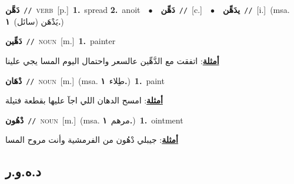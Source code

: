 \documentclass[10pt,a4paper,twoside]{article} %
\begin{document}
\begin{multicols}{2}
{\setlength\topsep{0pt}\textbf{\foreignlanguage{arabic}{دَهَّن}}\ {\color{gray}\texttt{//}\color{black}}\ \textsc{verb}\ [p.]\ \textbf{1.}~spread  \textbf{2.}~anoit\ \ $\bullet$\ \ \setlength\topsep{0pt}\textbf{\foreignlanguage{arabic}{دَهِّن}}\ {\color{gray}\texttt{//}\color{black}}\ [c.]\ \ $\bullet$\ \ \setlength\topsep{0pt}\textbf{\foreignlanguage{arabic}{يدَهِّن}}\ {\color{gray}\texttt{//}\color{black}}\ [i.]\ \color{gray}(msa. \foreignlanguage{arabic}{يَدْهَن (سائل)}~\foreignlanguage{arabic}{\textbf{١.}})\color{black}\ } \vspace{2mm}

{\setlength\topsep{0pt}\textbf{\foreignlanguage{arabic}{دَهِّين}}\ {\color{gray}\texttt{//}\color{black}}\ \textsc{noun}\ [m.]\ \textbf{1.}~painter\  \begin{flushright}\color{gray}\foreignlanguage{arabic}{\textbf{\underline{\foreignlanguage{arabic}{أمثلة}}}: اتفقت مع الدَّهِّين عالسعر واحتمال اليوم المسا يجي علينا}\end{flushright}\color{black}} \vspace{2mm}

{\setlength\topsep{0pt}\textbf{\foreignlanguage{arabic}{دْهَان}}\ {\color{gray}\texttt{//}\color{black}}\ \textsc{noun}\ [m.]\ \color{gray}(msa. \foreignlanguage{arabic}{طِلاء}~\foreignlanguage{arabic}{\textbf{١.}})\color{black}\ \textbf{1.}~paint\  \begin{flushright}\color{gray}\foreignlanguage{arabic}{\textbf{\underline{\foreignlanguage{arabic}{أمثلة}}}: امسح الدهان اللي اجآ عليها بقطعة فتيلة}\end{flushright}\color{black}} \vspace{2mm}

{\setlength\topsep{0pt}\textbf{\foreignlanguage{arabic}{دْهُون}}\ {\color{gray}\texttt{//}\color{black}}\ \textsc{noun}\ [m.]\ \color{gray}(msa. \foreignlanguage{arabic}{مرهم}~\foreignlanguage{arabic}{\textbf{١.}})\color{black}\ \textbf{1.}~ointment\  \begin{flushright}\color{gray}\foreignlanguage{arabic}{\textbf{\underline{\foreignlanguage{arabic}{أمثلة}}}: جيبلي دْهُون من الفرمشية وأنت مروح المسا}\end{flushright}\color{black}} \vspace{2mm}

\vspace{-3mm}
\subsection*{\color{blue}\foreignlanguage{arabic}{د.ه.و.ر}\color{blue}{}} 


\end{multicols}
\end{document}
